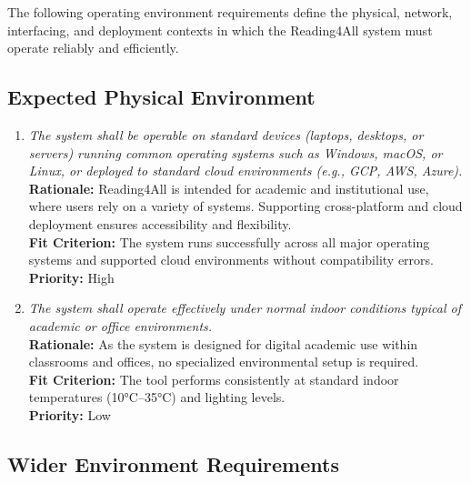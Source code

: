 \documentclass[12pt]{article}
\begin{document}
The following operating environment requirements define the physical, network, interfacing, and deployment contexts in which the Reading4All system must operate reliably and efficiently.

\subsection{Expected Physical Environment}

\begin{enumerate}[label=OER-EP\arabic*., wide=0pt, leftmargin=*]
  \item \emph{The system shall be operable on standard devices (laptops, desktops, or servers) running common operating systems such as Windows, macOS, or Linux, or deployed to standard cloud environments (e.g., GCP, AWS, Azure).}\\[2mm]
    {\bf Rationale:} Reading4All is intended for academic and institutional use, where users rely on a variety of systems. Supporting cross-platform and cloud deployment ensures accessibility and flexibility.\\
    {\bf Fit Criterion:} The system runs successfully across all major operating systems and supported cloud environments without compatibility errors.\\
    {\bf Priority:} High

  \item \emph{The system shall operate effectively under normal indoor conditions typical of academic or office environments.}\\[2mm]
    {\bf Rationale:} As the system is designed for digital academic use within classrooms and offices, no specialized environmental setup is required.\\
    {\bf Fit Criterion:} The tool performs consistently at standard indoor temperatures (10°C–35°C) and lighting levels.\\
    {\bf Priority:} Low
\end{enumerate}

\subsection{Wider Environment Requirements}
\end{document}
